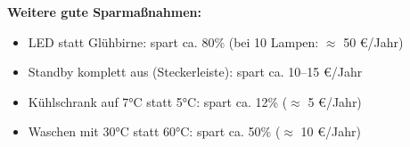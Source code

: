 \documentclass[11pt, a4paper]{article}
\begin{document}
\vspace{0.5em}
\begin{loesungskasten}
\textbf{Weitere gute Sparmaßnahmen:}
\begin{itemize}[nosep, leftmargin=1.5em]
    \item LED statt Glühbirne: spart ca. 80\% (bei 10 Lampen: $\approx$ 50 €/Jahr)
    \item Standby komplett aus (Steckerleiste): spart ca. 10--15 €/Jahr
    \item Kühlschrank auf 7°C statt 5°C: spart ca. 12\% ($\approx$ 5 €/Jahr)
    \item Waschen mit 30°C statt 60°C: spart ca. 50\% ($\approx$ 10 €/Jahr)
\end{itemize}
\end{loesungskasten}
\end{document}
